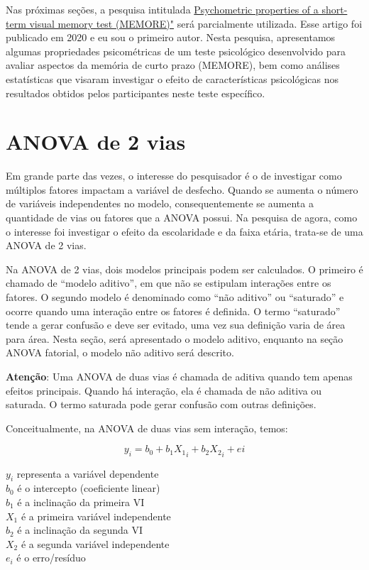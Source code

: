 \documentclass[
]{book}
\begin{document}
Nas próximas seções, a pesquisa intitulada \href{https://www.neuropsicolatina.org/index.php/Neuropsicologia_Latinoamericana/article/view/545}{Psychometric properties of a short-term visual memory test (MEMORE)"} será parcialmente utilizada. Esse artigo foi publicado em 2020 e eu sou o primeiro autor. Nesta pesquisa, apresentamos algumas propriedades psicométricas de um teste psicológico desenvolvido para avaliar aspectos da memória de curto prazo (MEMORE), bem como análises estatísticas que visaram investigar o efeito de características psicológicas nos resultados obtidos pelos participantes neste teste específico.

\hypertarget{anova-de-2-vias}{%
\section{ANOVA de 2 vias}\label{anova-de-2-vias}}

Em grande parte das vezes, o interesse do pesquisador é o de investigar como múltiplos fatores impactam a variável de desfecho. Quando se aumenta o número de variáveis independentes no modelo, consequentemente se aumenta a quantidade de vias ou fatores que a ANOVA possui. Na pesquisa de agora, como o interesse foi investigar o efeito da escolaridade e da faixa etária, trata-se de uma ANOVA de 2 vias.

Na ANOVA de 2 vias, dois modelos principais podem ser calculados. O primeiro é chamado de ``modelo aditivo'', em que não se estipulam interações entre os fatores. O segundo modelo é denominado como ``não aditivo'' ou ``saturado'' e ocorre quando uma interação entre os fatores é definida. O termo ``saturado'' tende a gerar confusão e deve ser evitado, uma vez sua definição varia de área para área. Nesta seção, será apresentado o modelo aditivo, enquanto na seção ANOVA fatorial, o modelo não aditivo será descrito.

\begin{warning}

\textbf{Atenção}: Uma ANOVA de duas vias é chamada de aditiva quando tem apenas efeitos principais. Quando há interação, ela é chamada de não aditiva ou saturada. O termo saturada pode gerar confusão com outras definições.

\end{warning}

Conceitualmente, na ANOVA de duas vias sem interação, temos:

\[y_i = b_0 + b_1X{_1}_i + b_2X{_2}_i + ei\]

\(y_i\) representa a variável dependente\\
\(b_0\) é o intercepto (coeficiente linear)\\
\(b_1\) é a inclinação da primeira VI\\
\(X_1\) é a primeira variável independente\\
\(b_2\) é a inclinação da segunda VI\\
\(X_2\) é a segunda variável independente\\
\(e_i\) é o erro/resíduo
\end{document}
